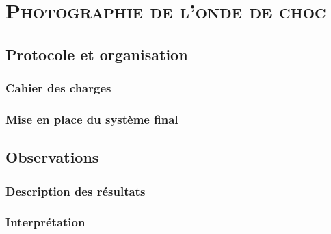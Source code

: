 \renewcommand{\chaptername}{\scshape Partie}
\chapter{\normalfont \scshape Photographie de l'onde de choc}
\section{Protocole et organisation}
\subsection{Cahier des charges}
\subsection{Mise en place du système final}
\section{Observations}
\subsection{Description des résultats}
\subsection{Interprétation}